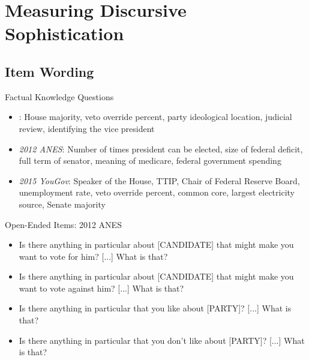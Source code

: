 \section{Measuring Discursive Sophistication}

\subsection{Item Wording}
\begin{frame}{Factual Knowledge Questions}
\begin{itemize}
\item \emph{\cite{carpini1993measuring}}: House majority, veto override percent, party ideological location, judicial review, identifying the vice president
\item \emph{2012 ANES}: Number of times president can be elected, size of federal deficit, full term of senator, meaning of medicare, federal government spending
\item \emph{2015 YouGov}: Speaker of the House, TTIP, Chair of Federal Reserve Board, unemployment rate, veto override percent, common core, largest electricity source, Senate majority
\end{itemize}
\end{frame}

\begin{frame}{Open-Ended Items: 2012 ANES}
\begin{itemize}
\item Is there anything in particular about [CANDIDATE] that might make you want to vote for him? [...] What is that?
\item Is there anything in particular about [CANDIDATE] that might make you want to vote against him? [...] What is that?
\item Is there anything in particular that you like about [PARTY]? [...] What is that?
\item Is there anything in particular that you don't like about [PARTY]? [...] What is that?
\end{itemize}
\end{frame}


